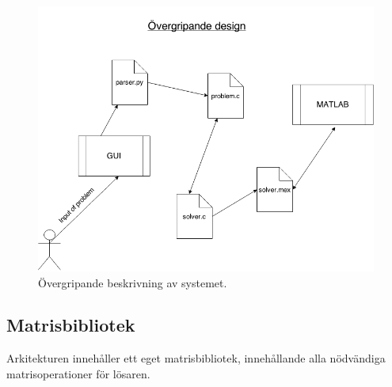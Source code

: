 \begin{figure}[H]
	\begin{center}
		\includegraphics[scale=0.5]{bilder/overgripande.png}
	\end{center}
	\caption{Övergripande beskrivning av systemet.}
\end{figure}

%



\subsection{Matrisbibliotek}
Arkitekturen innehåller ett eget matrisbibliotek, innehållande alla nödvändiga matrisoperationer för lösaren.

